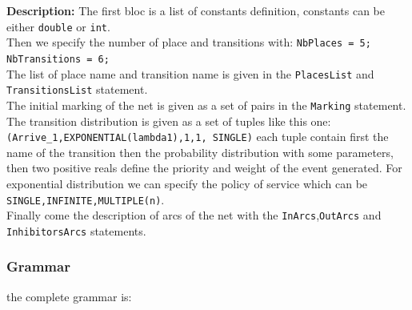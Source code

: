 \documentclass{article}
\begin{document}
{\bf Description:}
The first bloc is a list of constants definition, constants can be
either \verb|double| or \verb|int|.\\
Then we specify the number of place and transitions with:
\verb|NbPlaces = 5; NbTransitions = 6;|\\
The list of place name and transition name is given in the
\verb|PlacesList| and \verb|TransitionsList| statement.\\
The initial marking of the net is given as a set of pairs
in the \verb|Marking| statement.\\
The transition distribution is given as a set of tuples like
this one:\\ \verb|(Arrive_1,EXPONENTIAL(lambda1),1,1, SINGLE)|
each tuple contain first the name of the transition then
the probability distribution with some parameters, then two positive
reals define the priority and weight of the event generated.
For exponential distribution we can specify the policy of service
which can be \verb|SINGLE,INFINITE,MULTIPLE(n)|.\\
Finally come the description of arcs of the net with the 
\verb|InArcs|,\verb|OutArcs| and \verb|InhibitorsArcs| statements.



\subsubsection{Grammar}
the complete grammar is:
\end{document}
